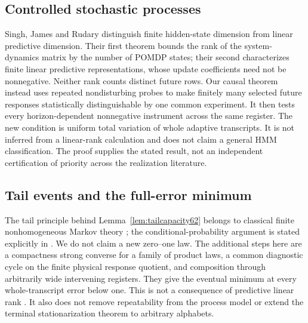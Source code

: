 \subsection{Controlled stochastic processes}
Singh, James and Rudary \cite[Theorems~2 and~6]{SJR2004} distinguish
finite hidden-state dimension from linear predictive dimension. Their
first theorem bounds the rank of the system-dynamics matrix by the
number of POMDP states; their second characterizes finite linear
predictive representations, whose update coefficients need not be
nonnegative. Neither rank counts distinct future rows.
Our causal theorem instead uses repeated nondisturbing probes to make
finitely many selected future responses statistically distinguishable
by one common experiment. It then tests every horizon-dependent
nonnegative instrument across the same register. The new condition is
uniform total variation of whole adaptive transcripts. It is not
inferred from a linear-rank calculation and does not claim a general
HMM classification. The proof supplies the stated result, not an
independent certification of priority across the realization literature.

\subsection{Tail events and the full-error minimum}
The tail principle behind Lemma~\ref{lem:tailcapacity62} belongs to
classical finite nonhomogeneous Markov theory
\cite{Blackwell62,Cohn62}; the conditional-probability argument is stated
explicitly in \cite[Theorem~1 and Section~5.1]{GS62}. We do not claim a
new zero--one law. The additional steps here are a compactness strong
converse for a family of product laws, a common diagnostic cycle on the
finite physical response quotient, and composition through arbitrarily
wide intervening registers. They give the eventual minimum at every
whole-transcript error below one. This is not a consequence of predictive
linear rank \cite[Theorems~2 and~6]{SJR2004}. It also does not remove
repeatability from the process model or extend the terminal
stationarization theorem to arbitrary alphabets.
